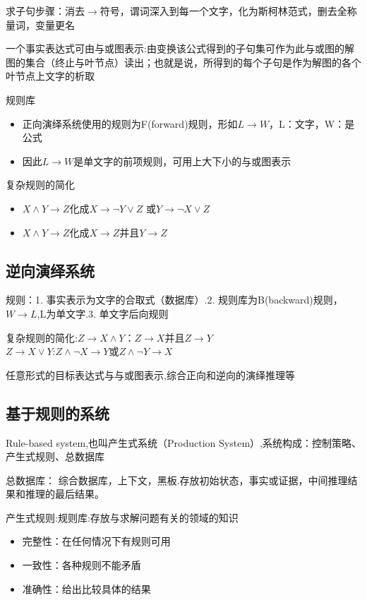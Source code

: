 \documentclass[UTF8,a4paper,landscape,16pt]{paper}
\begin{document}
\begin{multicols}{4}
\noindent 求子句步骤：消去$\rightarrow$符号，谓词深入到每一个文字，化为斯柯林范式，删去全称量词，变量更名
  
\noindent 一个事实表达式可由与或图表示:由变换该公式得到的子句集可作为此与或图的解图的集合（终止与叶节点）读出；也就是说，所得到的每个子句是作为解图的各个叶节点上文字的析取

\noindent 规则库
\begin{itemize}
\item 正向演绎系统使用的规则为F(forward)规则，形如$L\rightarrow W$，L：文字，W：是公式
\item 因此$L\rightarrow W$是单文字的前项规则，可用上大下小的与或图表示
\end{itemize}
\noindent 复杂规则的简化
\begin{itemize}
\item $X\land Y\rightarrow Z$化成$X\rightarrow \lnot Y\lor Z$ 或$Y\rightarrow\lnot X\lor Z$
\item $X\land Y\rightarrow Z$化成$X\rightarrow Z$并且$Y\rightarrow Z$
\end{itemize}

\subsection{逆向演绎系统}
\noindent 规则：1. 事实表示为文字的合取式（数据库）.2. 规则库为B(backward)规则，$W\rightarrow L$,L为单文字.3. 单文字后向规则

\noindent 复杂规则的简化:$Z\rightarrow X\land  Y$：$Z\rightarrow X$并且$Z\rightarrow Y$\\ $Z\rightarrow X\lor  Y$:$Z\land  \lnot X\rightarrow Y$或$Z\land \lnot Y\rightarrow X$

\noindent 任意形式的目标表达式与与或图表示,综合正向和逆向的演绎推理等

\subsection{基于规则的系统}
\noindent Rule-based system,也叫产生式系统（Production System）,系统构成：控制策略、产生式规则、总数据库

\noindent 总数据库： 综合数据库，上下文，黑板.存放初始状态，事实或证据，中间推理结果和推理的最后结果。

\noindent 产生式规则:规则库:存放与求解问题有关的领域的知识
\begin{itemize}
\item 完整性：在任何情况下有规则可用
\item 一致性：各种规则不能矛盾
\item 准确性：给出比较具体的结果
\end{itemize}   


\end{multicols}
\end{document}
